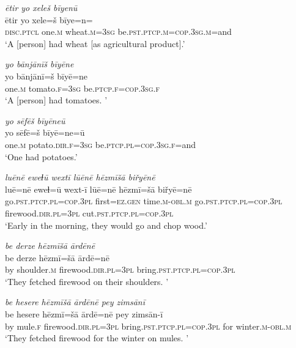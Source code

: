 \ea \label{ŽE.30}
\textit{ētir yo xeleš bīyenū} \\ 
\gll ētir yo xele=š bīye=n=\\ 
 \textsc{disc.ptcl} one\textsc{.m} wheat\textsc{.m}\textsc{=3sg} be\textsc{.pst}\textsc{.ptcp}\textsc{.m}\textsc{=cop}\textsc{.3sg}\textsc{.m}=and \\ 
\glt `A [person] had wheat [as agricultural product].'
\z 
 
\ea \label{ŽE.31}
\textit{yo bānjānīš bīyēne} \\ 
\gll yo bānjānī=š bīyē=ne \\ 
 one\textsc{.m} tomato\textsc{.f}\textsc{=3sg} be\textsc{.ptcp}\textsc{.f}\textsc{=cop}\textsc{.3sg}\textsc{.f} \\ 
\glt `A [person] had tomatoes. '
\z 
 
\ea \label{ŽE.32}
\textit{yo sēfēš bīyēneū} \\ 
\gll yo sēfē=š bīyē=ne=ū \\ 
 one\textsc{.m} potato\textsc{.dir}\textsc{.f}\textsc{=3sg} be\textsc{.ptcp}\textsc{.pl}\textsc{=cop}\textsc{.3sg}\textsc{.f}=and \\ 
\glt `One had potatoes.'
\z 
 
\ea \label{ŽE.33}
\textit{luēnē eweɫū wextī lūēnē hēzmīšā biřyēnē} \\ 
\gll luē=nē eweɫ=ū wext-ī lūē=nē hēzmī=šā biřyē=nē \\ 
 go\textsc{.pst}\textsc{.ptcp}\textsc{.pl}\textsc{=cop}\textsc{.3pl} first\textsc{\textsc{=ez.gen}} time\textsc{.m}\textsc{-obl}\textsc{.m} go\textsc{.pst}\textsc{.ptcp}\textsc{.pl}\textsc{=cop}\textsc{.3pl} firewood\textsc{.dir}\textsc{.pl}\textsc{=3pl} cut\textsc{.pst}\textsc{.ptcp}\textsc{.pl}\textsc{=cop}\textsc{.3pl} \\ 
\glt `Early in the morning, they would go and chop wood.'
\z 
 
\ea \label{ŽE.34}
\textit{be derze hēzmīšā ārdēnē} \\ 
\gll be derze hēzmī=šā ārdē=nē \\ 
 by shoulder\textsc{.m} firewood\textsc{.dir}\textsc{.pl}\textsc{=3pl} bring\textsc{.pst}\textsc{.ptcp}\textsc{.pl}\textsc{=cop}\textsc{.3pl} \\ 
\glt `They fetched firewood on their shoulders. '
\z 
 
\ea \label{ŽE.35}
\textit{be hesere hēzmīšā ārdēnē pey zimsānī} \\ 
\gll be hesere hēzmī=šā ārdē=nē pey zimsān-ī \\ 
 by mule\textsc{.f} firewood\textsc{.dir}\textsc{.pl}\textsc{=3pl} bring\textsc{.pst}\textsc{.ptcp}\textsc{.pl}\textsc{=cop}\textsc{.3pl} for winter\textsc{.m}\textsc{-obl}\textsc{.m} \\ 
\glt `They fetched firewood for the winter on mules. '
\z 
 
